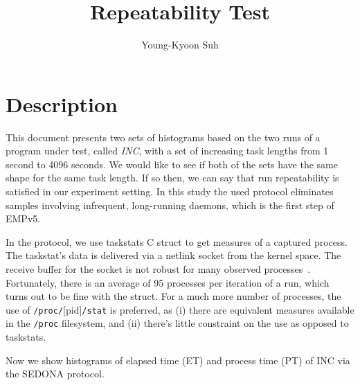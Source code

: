 \documentclass[10pt]{article}
\begin{document}
\title{Repeatability Test}

\author{
Young-Kyoon Suh\\
}
\maketitle

\section{Description}
This document presents two sets of histograms based on the two runs 
of a program under test, called {\em INC}, with a set of increasing task lengths 
from 1 second to 4096 seconds.
We would like to see if both of the sets have the same shape for the same task length.
If so then, we can say that run repeatability is satisfied in our experiment setting. 
In this study the used protocol eliminates samples involving infrequent, long-running daemons, 
which is the first step of EMPv5.

In the protocol, we use taskstats C struct to get measures of a captured process. 
The taskstat's data is delivered via a netlink socket from the kernel space. 
The receive buffer for the socket is not robust for many observed processes~\cite{Metrology}. 
Fortunately, there is an average of 95 processes per iteration of a run, 
which turns out to be fine with the struct. 
For a much more number of processes, 
the use of  {\tt /proc/}[pid]{\tt{/stat}} is preferred, 
as (i) there are equivalent measures available in the {\tt /proc} filesystem, 
and (ii) there's little constraint on the use as opposed to taskstats. 

Now we show histograms of elapsed time (ET) and process time (PT) of INC via the SEDONA protocol.

\pagebreak



\pagebreak
\newpage



\pagebreak
\newpage



\pagebreak
\newpage



\pagebreak
\newpage


\end{document}
